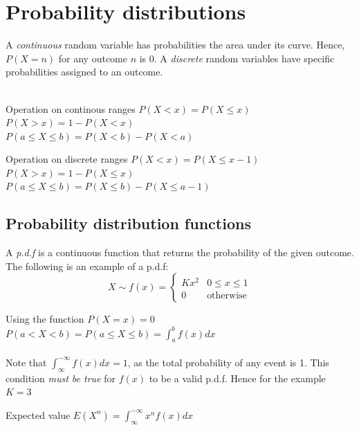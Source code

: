 \documentclass{article}
\begin{document}
\section{Probability distributions}
A \emph{continuous} random variable has probabilities the area under its curve. Hence, $P(X=n)$ for any outcome $n$ is $0$. A \emph{discrete} random variables have specific probabilities assigned to an outcome.\\
\\
\begin{minipage}{0.45\textwidth}
    \begin{knBox}[]{Operation on continous ranges}
        $P(X<x)=P(X\leq x)$\\
        $P(X>x)=1 - P(X<x)$\\
        $P(a\leq X\leq b)=P(X<b)-P(X<a)$
    \end{knBox}
\end{minipage}
\hfill
\begin{minipage}{0.45\textwidth}
    \begin{knBox}[]{Operation on discrete ranges}
        $P(X<x)=P(X\leq x-1)$\\
        $P(X>x)=1-P(X\leq x)$\\
        $P(a\leq X\leq b)=P(X\leq b)-P(X\leq a-1)$
    \end{knBox}
\end{minipage}
\subsection{Probability distribution functions}
A \emph{p.d.f} is a continuous function that returns the probability of the given outcome. The following is an example of a p.d.f:
\[
    X\sim f(x) = \begin{cases}
        Kx^2 & 0 \leq x \leq 1  \\
        0    & \text{otherwise}
    \end{cases}
\]
\begin{definition}[]{Using the function}
    $P(X=x)=0$\\
    $P(a<X<b)=P(a\leq X\leq b)=\int_{a}^{b}f(x)dx$\\
    \\
    Note that $\int_{\infty}^{-\infty}f(x)dx = 1$, as the total probability of any event is 1. This condition \emph{must be true} for $f(x)$ to be a valid p.d.f. Hence for the example $K=3$
\end{definition}
\begin{definition}[]{Expected value}
    $E(X^n)=\int_{\infty}^{-\infty}x^nf(x)dx$
\end{definition}
\end{document}
